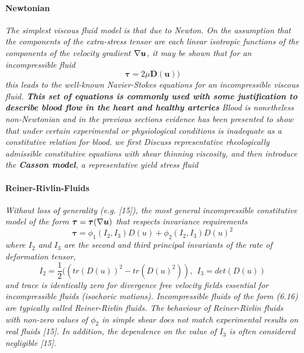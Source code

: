 \documentclass[11pt,letterpaper]{article}
\begin{document}
\paragraph{Newtonian}\textit{ The simplest viscous fluid model is that due to Newton. On the assumption that the components of the extra-stress tensor are each linear isotropic functions of the components of the velocity gradient $\nabla \bm{u} $, it may be shown that for an incompressible fluid
\begin{equation}
    \bm{\tau}= 2\mu \bm{D}(\bm{u}))
\end{equation}
this leads to the well-known Navier-Stokes equations for an incompressible viscous fluid. \textbf{This set of equations is commonly used with some justification to describe blood flow in the heart and healthy arteries} Blood is nonetheless non-Newtonian and in the previous sections evidence has been presented to show that under certain experimental or physiological conditions is inadequate as a constitutive relation for blood.}\newline\newline
\textit{ we first Discuss representative rheologically admissible constitutive equations with shear thinning viscosity, and then introduce the \textbf{Casson model}, a representative yield stress fluid}

\paragraph{Reiner-Rivlin-Fluids}
\textit{Without loss of generality (e.g. [15]), the most general incompressible constitutive model of the form $ \bm{\tau} = \bm{\tau}(\nabla \bm{u})$ that respects invariance requirements
\begin{equation}
    \bm{\tau }= \phi_1(I_2, I_3) D(u) + \phi_2(I_2,I_3)D(u)^2
\end{equation}
where $I_2$ and $I_3$ are the second and third principal invariants of the rate of deformation tensor,
\begin{equation}
    I_2= \frac{1}{2}((tr(D(u))^2-tr(D(u)^2)), \hspace{5pt}  I_3 = det(D(u))
\end{equation}
and trace is identically zero for divergence free velocity fields essential for incompressible fluids (isochoric motions). Incompressible fluids of the form (6.16) are typically called Reiner-Rivlin fluids. The behaviour of Reiner-Rivlin fluids with non-zero values of $\phi_2$ in simple shear does not match experimental results on real fluids [15]. In addition, the dependence on the value of $I_3$ is often considered negligible [15].
}
\end{document}
